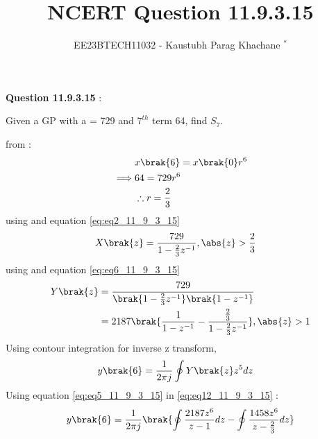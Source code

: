 \documentclass[journal,12pt,twocolumn]{IEEEtran}
\theoremstyle{remark}
\begin{document}

\vspace{3cm}

\Large\title{NCERT Question 11.9.3.15}
\large\author{EE23BTECH11032 - Kaustubh Parag Khachane $^{*}$%
}
\maketitle
\newpage
\bigskip

\renewcommand{\thefigure}{\theenumi}
\renewcommand{\thetable}{\theenumi}
\large\textbf{Question 11.9.3.15} :

Given a GP with a = 729 and $7^{th}$ term 64, find $S_7$.

\solution
\fi


from  :
\begin{align}
    &x\brak{6} = x\brak{0}r^6\\
    \implies &64 = 729r^6\\
    &\therefore r = \frac{2}{3}\label{eq:eq2_11_9_3_15}
\end{align}
using  and equation \eqref{eq:eq2_11_9_3_15}
\begin{align}
    &X\brak{z} = \frac{729}{1 - \frac{2}{3}z^{-1}}\label{eq:eq6_11_9_3_15},\abs{z} > \frac{2}{3}
\end{align}
using  and equation \eqref{eq:eq6_11_9_3_15}
\begin{align}
    Y\brak{z} &= \frac{729}{\brak{1 - \frac{2}{3}z^{-1}}\brak{1-z^{-1}}}\\
    &= 2187\brak{\frac{1}{1-z^{-1}} - \frac{\frac{2}{3}}{1 - \frac{2}{3}z^{-1}}} \label{eq:eq5_11_9_3_15},\abs{z}  > 1
\end{align}
Using contour integration for inverse z transform,
\begin{align}
    y\brak{6} &= \frac{1}{2\pi j}\oint Y\brak{z} z^{5} dz \label{eq:eq12_11_9_3_15}
\end{align}
Using equation \eqref{eq:eq5_11_9_3_15} in \eqref{eq:eq12_11_9_3_15} :
\begin{align}
    y\brak{6}= \frac{1}{2\pi j}\brak{\oint\frac{2187z^{6}}{z-1}dz - \oint\frac{1458z^{6}}{z - \frac{2}{3}} dz} \label{eq:eq8_11_9_3_15}
\end{align}
\end{document}
